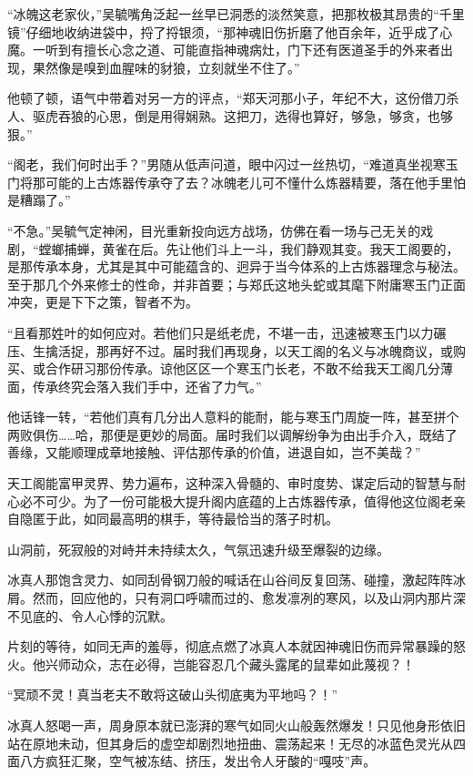 “冰魄这老家伙，”吴毓嘴角泛起一丝早已洞悉的淡然笑意，把那枚极其昂贵的“千里镜”仔细地收纳进袋中，捋了捋银须，“那神魂旧伤折磨了他百余年，近乎成了心魔。一听到有擅长心念之道、可能直指神魂病灶，门下还有医道圣手的外来者出现，果然像是嗅到血腥味的豺狼，立刻就坐不住了。”

他顿了顿，语气中带着对另一方的评点，“郑天河那小子，年纪不大，这份借刀杀人、驱虎吞狼的心思，倒是用得娴熟。这把刀，选得也算好，够急，够贪，也够狠。”

“阁老，我们何时出手？”男随从低声问道，眼中闪过一丝热切，“难道真坐视寒玉门将那可能的上古炼器传承夺了去？冰魄老儿可不懂什么炼器精要，落在他手里怕是糟蹋了。”

“不急。”吴毓气定神闲，目光重新投向远方战场，仿佛在看一场与己无关的戏剧，“螳螂捕蝉，黄雀在后。先让他们斗上一斗，我们静观其变。我天工阁要的，是那传承本身，尤其是其中可能蕴含的、迥异于当今体系的上古炼器理念与秘法。至于那几个外来修士的性命，并非首要；与郑氏这地头蛇或其麾下附庸寒玉门正面冲突，更是下下之策，智者不为。

“且看那姓叶的如何应对。若他们只是纸老虎，不堪一击，迅速被寒玉门以力碾压、生擒活捉，那再好不过。届时我们再现身，以天工阁的名义与冰魄商议，或购买、或合作研习那份传承。谅他区区一个寒玉门长老，不敢不给我天工阁几分薄面，传承终究会落入我们手中，还省了力气。”

他话锋一转，“若他们真有几分出人意料的能耐，能与寒玉门周旋一阵，甚至拼个两败俱伤……哈，那便是更妙的局面。届时我们以调解纷争为由出手介入，既结了善缘，又能顺理成章地接触、评估那传承的价值，进退自如，岂不美哉？”

天工阁能富甲灵界、势力遍布，这种深入骨髓的、审时度势、谋定后动的智慧与耐心必不可少。为了一份可能极大提升阁内底蕴的上古炼器传承，值得他这位阁老亲自隐匿于此，如同最高明的棋手，等待最恰当的落子时机。

\vspace{2em}

山洞前，死寂般的对峙并未持续太久，气氛迅速升级至爆裂的边缘。

冰真人那饱含灵力、如同刮骨钢刀般的喊话在山谷间反复回荡、碰撞，激起阵阵冰屑。然而，回应他的，只有洞口呼啸而过的、愈发凛冽的寒风，以及山洞内那片深不见底的、令人心悸的沉默。

片刻的等待，如同无声的羞辱，彻底点燃了冰真人本就因神魂旧伤而异常暴躁的怒火。他兴师动众，志在必得，岂能容忍几个藏头露尾的鼠辈如此蔑视？！

“冥顽不灵！真当老夫不敢将这破山头彻底夷为平地吗？！”

冰真人怒喝一声，周身原本就已澎湃的寒气如同火山般轰然爆发！只见他身形依旧站在原地未动，但其身后的虚空却剧烈地扭曲、震荡起来！无尽的冰蓝色灵光从四面八方疯狂汇聚，空气被冻结、挤压，发出令人牙酸的“嘎吱”声。

